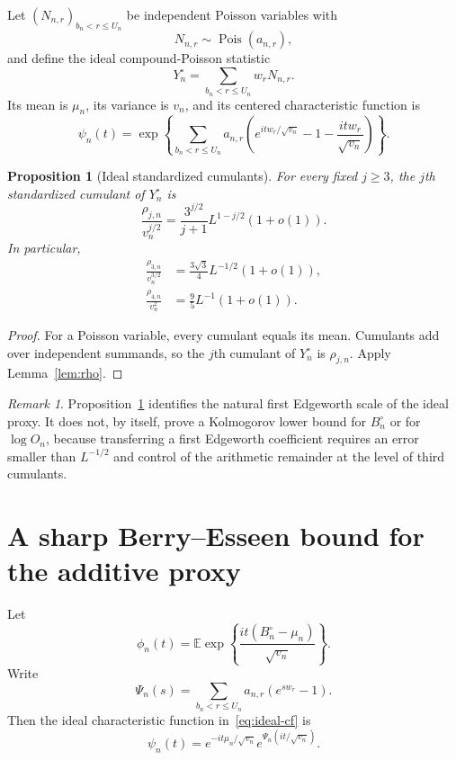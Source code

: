 \documentclass[11pt]{article}
\newtheorem{proposition}[theorem]{Proposition}
\theoremstyle{remark}
\newtheorem{remark}[theorem]{Remark}
\newcommand{\Ee}{\mathbb E}
\newcommand{\Pois}{\operatorname{Pois}}
\begin{document}
Let $(N_{n,r})_{b_n<r\le U_n}$ be independent Poisson variables with
\[
 N_{n,r}\sim\Pois(a_{n,r}),
\]
and define the ideal compound-Poisson statistic
\[
 Y_n^\circ=\sum_{b_n<r\le U_n}w_rN_{n,r}.
\]
Its mean is $\mu_n$, its variance is $v_n$, and its centered characteristic
function is
\begin{equation}
\label{eq:ideal-cf}
 \psi_n(t)=
 \exp\left\{
 \sum_{b_n<r\le U_n}a_{n,r}
 \left(e^{itw_r/\sqrt{v_n}}-1-\frac{itw_r}{\sqrt{v_n}}\right)
 \right\}.
\end{equation}

\begin{proposition}[Ideal standardized cumulants]
\label{prop:cumulants}
For every fixed $j\ge3$, the $j$th standardized cumulant of $Y_n^\circ$
is
\[
 \frac{\rho_{j,n}}{v_n^{j/2}} =\frac{3^{j/2}}{j+1}L^{1-j/2}(1+o(1)).
\]
In particular,
\begin{align*}
 \frac{\rho_{3,n}}{v_n^{3/2}}
 &=\frac{3\sqrt3}{4}L^{-1/2}(1+o(1)),\\
 \frac{\rho_{4,n}}{v_n^2}
 &=\frac95L^{-1}(1+o(1)).
\end{align*}
\end{proposition}

\begin{proof}
For a Poisson variable, every cumulant equals its mean.  Cumulants add over
independent summands, so the $j$th cumulant of $Y_n^\circ$ is
$\rho_{j,n}$.  Apply Lemma~\ref{lem:rho}.
\end{proof}

\begin{remark}
Proposition~\ref{prop:cumulants} identifies the natural first Edgeworth
scale of the ideal proxy.  It does not, by itself, prove a Kolmogorov lower
bound for $B_n^\circ$ or for $\log O_n$, because transferring a first
Edgeworth coefficient requires an error smaller than $L^{-1/2}$ and
control of the arithmetic remainder at the level of third cumulants.
\end{remark}

\section{A sharp Berry--Esseen bound for the additive proxy}

Let
\[
 \phi_n(t)=\Ee\exp\left\{
 \frac{it(B_n^\circ-\mu_n)}{\sqrt{v_n}}
 \right\}.
\]
Write
\[
 \Psi_n(s)=\sum_{b_n<r\le U_n}a_{n,r}(e^{sw_r}-1).
\]
Then the ideal characteristic function in~\eqref{eq:ideal-cf} is
\[
 \psi_n(t)=e^{-it\mu_n/\sqrt{v_n}}
 e^{\Psi_n(it/\sqrt{v_n})}.
\]
\end{document}
